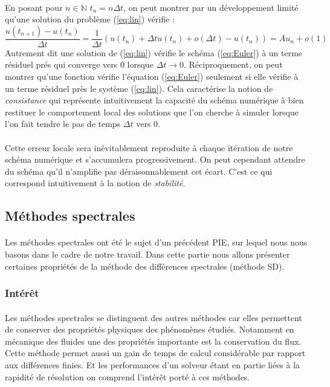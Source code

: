         \paragraph{}
        En posant pour $n\in \mathbb{N}$ $t_n = n \Delta t$, on peut montrer par un développement limité qu'une solution du problème (\ref{eq:lin}) vérifie : $$\frac{u(t_{n+1}) -u(t_n)}{\Delta t} = \frac{1}{\Delta t}\left(u(t_n) + \Delta t \dot{u}(t_n) +o(\Delta t) - u(t_n)\right) = Au_n +o(1)$$ Autrement dit une solution de (\ref{eq:lin}) vérifie le schéma (\ref{eq:Euler}) à un terme résiduel prés qui converge vers 0 lorsque $\Delta t \rightarrow 0$. Réciproquement, on peut montrer qu'une fonction vérifie l'équation (\ref{eq:Euler}) seulement si elle vérifie à un terme résiduel près le système (\ref{eq:lin}). Cela caractérise la notion de \emph{consistance} qui représente intuitivement la capacité du schéma numérique à bien restituer le comportement local des solutions que l'on cherche à simuler lorsque l'on fait tendre le pas de temps $\Delta t$ vers 0.

        \paragraph{}
        Cette erreur locale sera inévitablement reproduite à chaque itération de notre schéma numérique et s'accumulera progressivement. On peut cependant attendre du schéma qu'il n'amplifie pas déraisonnablement cet écart. C'est ce qui correspond intuitivement à la notion de \emph{stabilité}.


\subsection{Méthodes spectrales}

    \paragraph{}
    Les méthodes spectrales ont été le sujet d'un précédent PIE, sur lequel nous nous basons dans le cadre de notre travail. Dans cette partie nous allons présenter certaines propriétés de la méthode des différences spectrales (méthode SD).

    \subsubsection{Intérêt}
        \paragraph{}
        Les méthodes spectrales se distinguent des autres méthodes car elles permettent de conserver des propriétés physiques des phénomènes étudiés. Notamment en mécanique des fluides une des propriétés importante est la conservation du flux. Cette méthode permet aussi un gain de temps de calcul considérable par rapport aux différences finies. Et les performances d'un solveur étant en partie liées à la rapidité de résolution on comprend l'intérêt porté à ces méthodes.

